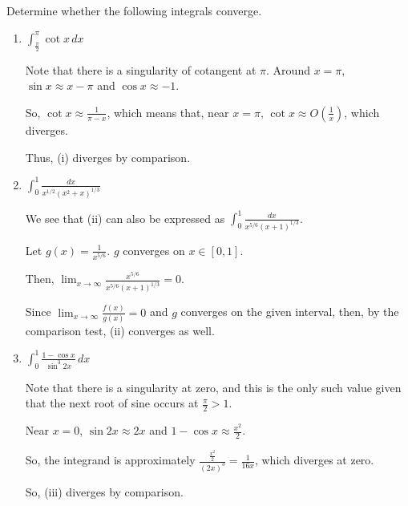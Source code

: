 \documentclass{subfiles}
\begin{document}
\begin{problem}[2]
Determine whether the following integrals converge.
\begin{enumerate}[label=\roman*)]
	\item $\int_{\frac{\pi}{2}}^{\pi} \cot{x} \,dx$

	      Note that there is a singularity of cotangent at $\pi$.
	      Around $x=\pi$, $\sin{x}\approx x - \pi$ and $\cos{x} \approx -1$.

	      So, $\cot{x}\approx \frac{1}{\pi - x}$, which means that, near $x = \pi,\, \cot{x}\approx O(\frac{1}{x})$, which diverges.

	      Thus, (i) diverges by comparison.

	\item $\int_{0}^{1} \frac{dx}{x^{1 / 2}{(x^2 + x)}^{1 / 3}}$

	      We see that (ii) can also be expressed as $\int_{0}^{1} \frac{dx}{x^{5 / 6}{(x + 1)}^{1 / 3}}$.

	      Let $g(x)=\frac{1}{x^{5 / 6}}$. $g$ converges on $x \in [0,1]$.

	      Then, $\lim_{x \to \infty} \frac{x^{5 / 6}}{x^{5 / 6}{(x + 1)}^{1 / 3}} = 0$.

	      Since $\lim_{x \to \infty} \frac{f(x)}{g(x)} = 0$ and $g$ converges on the given interval,
	      then, by the comparison test, (ii) converges as well.

	\item $\int_{0}^{1} \frac{1-\cos{x}}{\sin^3{2x}} \,dx$

	      Note that there is a singularity at zero,
	      and this is the only such value given that the next root of sine occurs at $\frac{\pi}{2}>1 $.

	      Near $x=0$,  $\sin{2x}\approx 2x$ and $1-\cos{x}\approx \frac{x^2}{2}$.

	      So, the integrand is approximately  $\frac{\frac{x^2}{2}}{{(2x)}^3} = \frac{1}{16x}$, which diverges at zero.

	      So, (iii) diverges by comparison.
\end{enumerate}
\end{problem}
\end{document}
